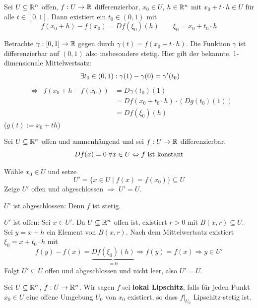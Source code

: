 \documentclass[main.tex]{subfiles}
\begin{document}
\begin{Theorem}[Mittelwertsatz]
  Sei $U \subseteq \mathbb{R}^n$ offen, $f: U \to \mathbb{R}$ differenzierbar, $x_0 \in U$, $h \in \mathbb{R}^n$ mit $x_0 + t\cdot h \in U$ für alle $t \in [0,1]$. Dann existiert ein $t_0 \in (0,1)$ mit
  $$f(x_0 + h) - f(x_0) = Df(\xi_0)(h) \qquad \xi_0 = x_0 +t_0 \cdot h$$
\end{Theorem}

\begin{Beweis}
  Betrachte $\gamma: [0,1] \to \mathbb{R}$ gegen durch $\gamma(t) = f(x_0 + t\cdot h)$. Die Funktion $\gamma$ ist differenzierbar auf $(0,1)$ also insbesondere stetig. Hier gilt der bekannte, 1-dimensionale Mittelwertsatz:
  $$\;\exists t_0 \in (0,1): \gamma(1) - \gamma(0) = \gamma'(t_0)$$
  $$\begin{aligned}
    & \Leftrightarrow & f(x_0 + h - f(x_0)) & = D\gamma(t_0)(1) \\
    & & & = Df(x_0 + t_0 \cdot h) \cdot (Dg(t_0)(1)) \\
    & & & = Df(\xi_0)(h)
  \end{aligned}$$
  ($g(t):= x_0 + th$)
\end{Beweis}

\begin{Korollar}
  Sei $U \subseteq \mathbb{R}^n$ offen und ammenhängend und sei $f: U \to \mathbb{R}$ differenzierbar.
  $$Df(x) = 0 \;\forall x \in U\Leftrightarrow f \text{ ist konstant}$$
\end{Korollar}

\begin{Beweis}
  Wähle $x_0 \in U$ und setze
  $$U' = \{x \in U \mid f(x) = f(x_0) \} \subseteq U$$
  Zeige $U'$ offen und abgeschlossen $\Rightarrow$ $U' = U$.

  $U'$ ist abgeschlossen: Denn $f$ ist stetig.

  $U'$ ist offen: Sei $x \in U'$. Da $U \subseteq \mathbb{R}^n$ offen ist, existiert $r > 0$ mit $B(x,r) \subseteq U$. Sei $y = x+h$ ein Element von $B(x,r)$. Nach dem Mittelwertsatz existiert $\xi_0 = x + t_0 \cdot h$ mit
  $$f(y) - f(x) = \underbrace{Df(\xi_0)(h)}_{=0} \Rightarrow f(y) = f(x) \Rightarrow y \in U'$$
  Folgt $U' \subseteq U$ offen und abgeschlossen und nicht leer, also $U' = U$.
\end{Beweis}

\begin{Definition}
  Sei $U \subseteq \mathbb{R}^n$, $f: U \to \mathbb{R}^n$. Wir sagen $f$ sei \textbf{lokal Lipschitz}, falls für jeden Punkt $x_0 \in U$ eine offene Umgebung $U_0$ von $x_0$ existiert, so dass $f |_{U_0}$ Lipschitz-stetig ist.
\end{Definition}
\end{document}
